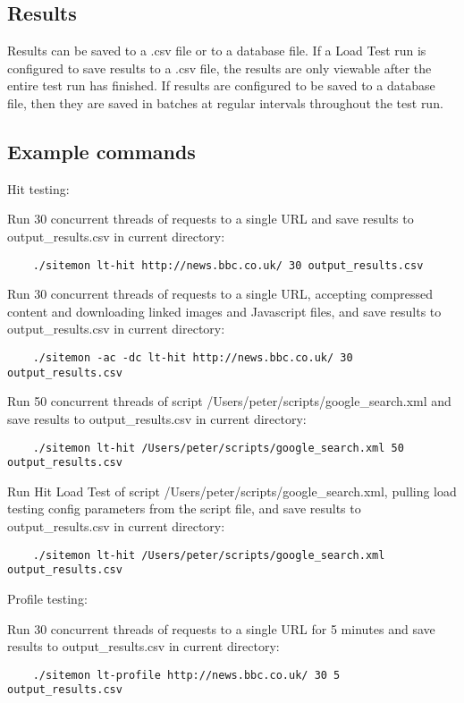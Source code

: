 \documentclass[a4paper]{article}
\begin{document}
\subsection{Results}
Results can be saved to a .csv file or to a database file. If a Load Test run is configured to save results to a .csv file,
 the results are only viewable after the entire test run has finished. If results are configured to be saved to a database
 file, then they are saved in batches at regular intervals throughout the test run.

\subsection{Example commands}

Hit testing:

Run 30 concurrent threads of requests to a single URL and save results to output\_results.csv in current directory:
\begin{verbatim}
	./sitemon lt-hit http://news.bbc.co.uk/ 30 output_results.csv
\end{verbatim}

Run 30 concurrent threads of requests to a single URL, accepting compressed content and downloading linked images
 and Javascript files, and save results to output\_results.csv in current directory:
\begin{verbatim}
	./sitemon -ac -dc lt-hit http://news.bbc.co.uk/ 30 output_results.csv
\end{verbatim}

Run 50 concurrent threads of script /Users/peter/scripts/google\_search.xml and save results to output\_results.csv in current directory:
\begin{verbatim}
	./sitemon lt-hit /Users/peter/scripts/google_search.xml 50 output_results.csv
\end{verbatim}

Run Hit Load Test of script /Users/peter/scripts/google\_search.xml, pulling load testing config parameters from the script file, 
 and save results to output\_results.csv in current directory:
\begin{verbatim}
	./sitemon lt-hit /Users/peter/scripts/google_search.xml output_results.csv
\end{verbatim}

\pagebreak

Profile testing:

Run 30 concurrent threads of requests to a single URL for 5 minutes and save results to output\_results.csv in current directory:
\begin{verbatim}
	./sitemon lt-profile http://news.bbc.co.uk/ 30 5 output_results.csv
\end{verbatim}
\end{document}
